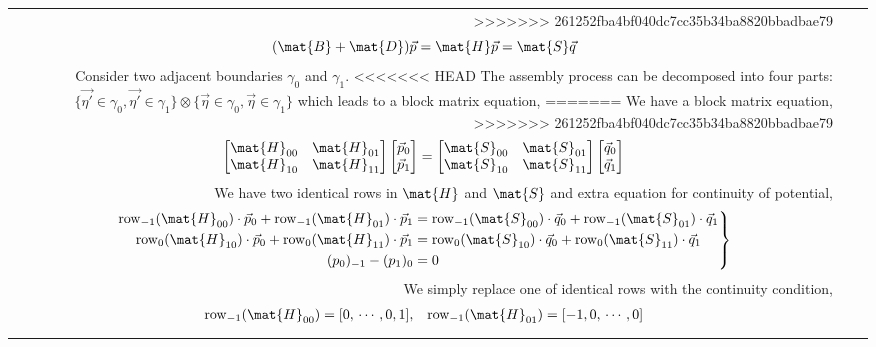 \documentclass{jfm}
\begin{document}
\begin{table}
\begin{center}
\begin{tabular}{rl|l}
>>>>>>> 261252fba4bf040dc7cc35b34ba8820bbadbae79
\begin{equation}
(\mat{B}+\mat{D})\vec{p} =\mat{H}\vec{p} = \mat{S}\vec{q}
\end{equation}
Consider two adjacent boundaries $\gamma_0$ and $\gamma_1$.
<<<<<<< HEAD
The assembly process can be decomposed into
four parts: 
$\{\vec{\eta'}\in\gamma_0,\vec{\eta'}\in\gamma_1\}\otimes\{\vec{\eta}\in\gamma_0,\vec{\eta}\in\gamma_1\}$
which leads to a block matrix equation,
=======
We have a block matrix equation,
>>>>>>> 261252fba4bf040dc7cc35b34ba8820bbadbae79
\begin{equation}
\begin{bmatrix}
\mat{H}_{00}&\mat{H}_{01}\\\mat{H}_{10}&\mat{H}_{11}
\end{bmatrix}
\begin{bmatrix}
\vec{p}_0\\\vec{p}_1
\end{bmatrix}
=\begin{bmatrix}
\mat{S}_{00}&\mat{S}_{01}\\\mat{S}_{10}&\mat{S}_{11}
\end{bmatrix}
\begin{bmatrix}
\vec{q}_0\\\vec{q}_1
\end{bmatrix}
\end{equation}
We have two identical rows in $\mat{H}$ and $\mat{S}$ 
and extra equation for continuity of potential,
\begin{equation}\left.\begin{aligned}
\mathrm{row}_{-1}(\mat{H}_{00})\cdot\vec{p}_0
+\mathrm{row}_{-1}(\mat{H}_{01})\cdot\vec{p}_1
&=\mathrm{row}_{-1}(\mat{S}_{00})\cdot\vec{q}_0
+\mathrm{row}_{-1}(\mat{S}_{01})\cdot\vec{q}_1\\
\mathrm{row}_{0}(\mat{H}_{10})\cdot\vec{p}_0
+\mathrm{row}_{0}(\mat{H}_{11})\cdot\vec{p}_1
&=\mathrm{row}_{0}(\mat{S}_{10})\cdot\vec{q}_0
+\mathrm{row}_{0}(\mat{S}_{11})\cdot\vec{q}_1\\
(p_0)_{-1}-(p_1)_{0}&=0
\end{aligned}\right\}\end{equation}
We simply replace one of identical rows with the continuity condition,
\begin{equation}\begin{aligned}
\mathrm{row}_{-1}(\mat{H}_{00}) &= [0, \,\cdots ,0 , 1],&
\mathrm{row}_{-1}(\mat{H}_{01}) &= [-1,0, \,\cdots ,0 ]\\

\end{aligned}
\end{equation}
\end{tabular}
\end{center}
\end{table}
\end{document}
